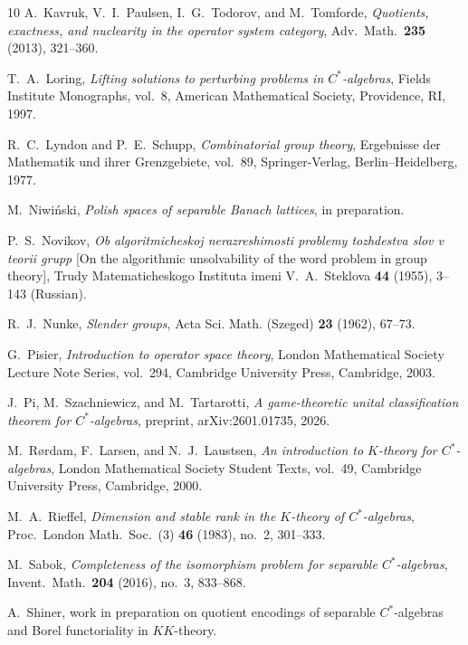 \documentclass[12pt,fleqn,a4paper]{amsart}
\numberwithin{equation}{section}
\theoremstyle{definition}
\begin{document}
\begin{thebibliography}{10}
A.~Kavruk, V.~I.~Paulsen, I.~G.~Todorov, and M.~Tomforde,
\emph{Quotients, exactness, and nuclearity in the operator system category},
Adv.\ Math.\ \textbf{235} (2013), 321--360.

T.~A.~Loring,
\emph{Lifting solutions to perturbing problems in $C^*$-algebras},
Fields Institute Monographs, vol.~8,
American Mathematical Society, Providence, RI, 1997.

R.~C.~Lyndon and P.~E.~Schupp,
\emph{Combinatorial group theory},
Ergebnisse der Mathematik und ihrer Grenzgebiete, vol.~89,
Springer-Verlag, Berlin--Heidelberg, 1977.

M.~Niwi{\'n}ski,
\emph{Polish spaces of separable Banach lattices},
in preparation.

P.~S.~Novikov,
\emph{Ob algoritmicheskoj nerazreshimosti problemy tozhdestva slov v teorii grupp}
[On the algorithmic unsolvability of the word problem in group theory],
Trudy Matematicheskogo Instituta imeni V.~A.~Steklova \textbf{44} (1955), 3--143
(Russian).

R.~J.~Nunke,
\emph{Slender groups},
Acta Sci. Math. (Szeged) \textbf{23} (1962), 67--73.

G.~Pisier,
\emph{Introduction to operator space theory},
London Mathematical Society Lecture Note Series, vol.~294,
Cambridge University Press, Cambridge, 2003.

J.~Pi, M.~Szachniewicz, and M.~Tartarotti,
\emph{A game-theoretic unital classification theorem for $C^*$-algebras},
preprint, arXiv:2601.01735, 2026.

M.~R{\o}rdam, F.~Larsen, and N.~J.~Laustsen,
\emph{An introduction to $K$-theory for $C^*$-algebras},
London Mathematical Society Student Texts, vol.~49,
Cambridge University Press, Cambridge, 2000.

M.~A.~Rieffel,
\emph{Dimension and stable rank in the $K$-theory of $C^*$-algebras},
Proc.\ London Math.\ Soc.\ (3) \textbf{46} (1983), no.~2, 301--333.

M.~Sabok,
\emph{Completeness of the isomorphism problem for separable $C^*$-algebras},
Invent.\ Math.\ \textbf{204} (2016), no.~3, 833--868.

A.~Shiner,
work in preparation on quotient encodings of separable $C^*$-algebras and Borel
functoriality in $KK$-theory.


\end{thebibliography}
\end{document}
